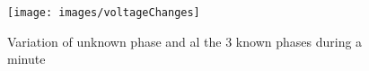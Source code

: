 \begin{figure} 
	\centering
	\texttt{[image: images/voltageChanges]}
	\caption[Variation of unknown phase and al the 3 known phases during a minute]{Variation of unknown phase and al the 3 known phases during a minute}
	\label{fig:voltageChanges}
	\vspace*{-3ex}
\end{figure}
